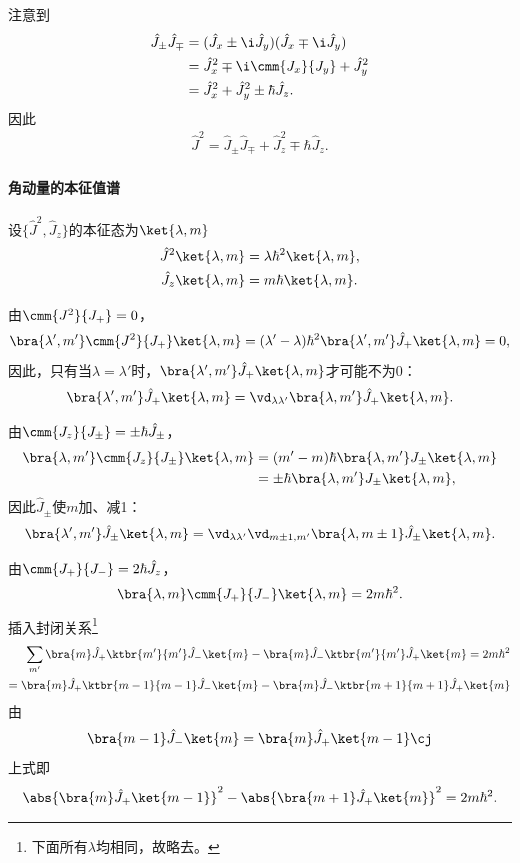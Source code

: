 注意到
\begin{align*}
	\hat J_\pm\hat J_\mp&=(\hat J_x\pm\i\hat J_y)(\hat J_x\mp\i\hat J_y)\\
	&=\hat J_x^2\mp\i\cmm{J_x}{J_y}+\hat J_y^2\\
	&=\hat J_x^2+\hat J_y^2\pm\hbar\hat J_z.
\end{align*}
因此 
\begin{align}
	\hat J^2=\hat J_\pm\hat J_\mp+\hat J_z^2\mp\hbar\hat J_z.
\end{align}
\paragraph{角动量的本征值谱}设$\{\hat J^2,\hat J_z\}$的本征态为$\ket{\lambda,m}$
\begin{align*}
	\hat J^2\ket{\lambda,m}&=\lambda\hbar^2\ket{\lambda,m},\\
	\hat J_z\ket{\lambda,m}&=m\hbar\ket{\lambda,m}.
\end{align*}

由$\cmm{J^2}{J_+}=0$，
\[
	\bra{\lambda',m'}\cmm{J^2}{J_+}\ket{\lambda,m}=(\lambda'-\lambda)\hbar^2\bra{\lambda',m'}\hat J_+\ket{\lambda,m}=0,
\]
因此，只有当$\lambda=\lambda'$时，$\bra{\lambda',m'}\hat J_+\ket{\lambda,m}$才可能不为0：
\begin{align}
	\bra{\lambda',m'}\hat J_+\ket{\lambda,m}=\vd_{\lambda\lambda'}\bra{\lambda,m'}\hat J_+\ket{\lambda,m}.
\end{align}

由$\cmm{J_z}{J_\pm}=\pm\hbar\hat J_\pm$，
\begin{align*}
	\bra{\lambda,m'}\cmm{J_z}{J_\pm}\ket{\lambda,m}&=(m'-m)\hbar\bra{\lambda,m'}J_\pm\ket{\lambda,m}\\
	&=\pm\hbar\bra{\lambda,m'}J_\pm\ket{\lambda,m},
\end{align*}
因此$\hat J_\pm$使$m$加、减1：
\begin{align}
	\bra{\lambda',m'}\hat J_\pm\ket{\lambda,m}=\vd_{\lambda\lambda'}\vd_{m\pm 1,m'}\bra{\lambda,m\pm 1}\hat J_\pm\ket{\lambda,m}.
\end{align}

由$\cmm{J_+}{J_-}=2\hbar\hat J_z$，
\[
	\bra{\lambda,m}\cmm{J_+}{J_-}\ket{\lambda,m}=2m\hbar^2.
\]%
插入封闭关系\footnote{下面所有$\lambda$均相同，故略去。}
\begin{align*}
	\sum_{m'}\bra{m}\hat J_+\ktbr{m'}{m'}\hat J_-\ket{m}-\bra{m}\hat J_-\ktbr{m'}{m'}\hat J_+\ket{m}=2m\hbar^2\\
	=\bra{m}\hat J_+\ktbr{m-1}{m-1}\hat J_-\ket{m}-\bra{m}\hat J_-\ktbr{m+1}{m+1}\hat J_+\ket{m}
\end{align*}
由
\[
	\bra{m-1}\hat J_-\ket{m}=\bra{m}\hat J_+\ket{m-1}\cj
\]
上式即
\begin{align}
	\abs{\bra{m}\hat J_+\ket{m-1}}^2-\abs{\bra{m+1}\hat J_+\ket{m}}^2=2m\hbar^2.
\end{align}

